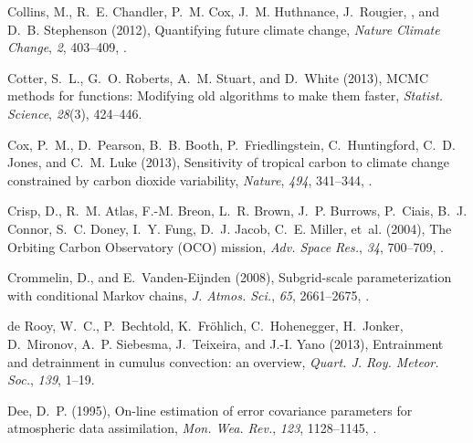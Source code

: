 \documentclass[draft]{agujournal}
\begin{document}
\begin{thebibliography}{196}
Collins, M., R.~E. Chandler, P.~M. Cox, J.~M. Huthnance, J.~Rougier, , and
  D.~B. Stephenson (2012), Quantifying future climate change, \textit{Nature
  Climate Change}, \textit{2}, 403--409, .

Cotter, S.~L., G.~O. Roberts, A.~M. Stuart, and D.~White (2013), {MCMC} methods
  for functions: {M}odifying old algorithms to make them faster,
  \textit{Statist. Science}, \textit{28}(3), 424--446.

Cox, P.~M., D.~Pearson, B.~B. Booth, P.~Friedlingstein, C.~Huntingford, C.~D.
  Jones, and C.~M. Luke (2013), Sensitivity of tropical carbon to climate
  change constrained by carbon dioxide variability, \textit{Nature},
  \textit{494}, 341--344, .

Crisp, D., R.~M. Atlas, F.-M. Breon, L.~R. Brown, J.~P. Burrows, P.~Ciais,
  B.~J. Connor, S.~C. Doney, I.~Y. Fung, D.~J. Jacob, C.~E. Miller, et~al.
  (2004), The {O}rbiting {C}arbon {O}bservatory ({OCO}) mission, \textit{Adv.
  Space Res.}, \textit{34}, 700--709, .

Crommelin, D., and E.~Vanden-Eijnden (2008), Subgrid-scale parameterization
  with conditional {M}arkov chains, \textit{J. Atmos. Sci.}, \textit{65},
  2661--2675, .

{de Rooy}, W.~C., P.~Bechtold, K.~Fr{\"o}hlich, C.~Hohenegger, H.~Jonker,
  D.~Mironov, A.~P. Siebesma, J.~Teixeira, and J.-I. Yano (2013), Entrainment
  and detrainment in cumulus convection: an overview, \textit{Quart. J. Roy.
  Meteor. Soc.}, \textit{139}, 1--19.

Dee, D.~P. (1995), On-line estimation of error covariance parameters for
  atmospheric data assimilation, \textit{Mon. Wea. Rev.}, \textit{123},
  1128--1145, .


\end{thebibliography}
\end{document}
